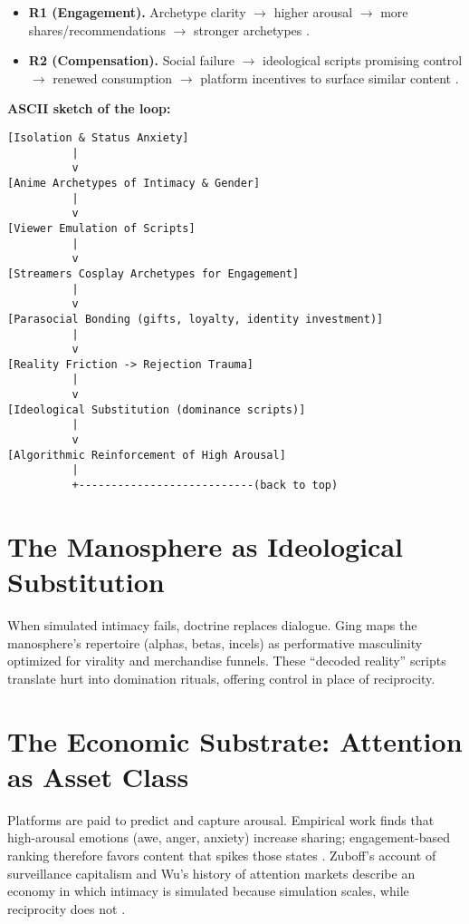 \documentclass[12pt]{article}
\begin{document}
\begin{itemize}
  \item \textbf{R1 (Engagement).} Archetype clarity $\rightarrow$ higher arousal $\rightarrow$ more shares/recommendations $\rightarrow$ stronger archetypes \cite{berger2012}.
  \item \textbf{R2 (Compensation).} Social failure $\rightarrow$ ideological scripts promising control $\rightarrow$ renewed consumption $\rightarrow$ platform incentives to surface similar content \cite{ging2019,zuboff2019,wu2016}.
\end{itemize}

\noindent\textbf{ASCII sketch of the loop:}

\begin{verbatim}
[Isolation & Status Anxiety]
          |
          v
[Anime Archetypes of Intimacy & Gender]
          |
          v
[Viewer Emulation of Scripts]
          |
          v
[Streamers Cosplay Archetypes for Engagement]
          |
          v
[Parasocial Bonding (gifts, loyalty, identity investment)]
          |
          v
[Reality Friction -> Rejection Trauma]
          |
          v
[Ideological Substitution (dominance scripts)]
          |
          v
[Algorithmic Reinforcement of High Arousal]
          |
          +---------------------------(back to top)
\end{verbatim}

\section{The Manosphere as Ideological Substitution}

When simulated intimacy fails, doctrine replaces dialogue. Ging \cite{ging2019} maps the manosphere's repertoire (alphas, betas, incels) as performative masculinity optimized for virality and merchandise funnels. These ``decoded reality'' scripts translate hurt into domination rituals, offering control in place of reciprocity.

\section{The Economic Substrate: Attention as Asset Class}

Platforms are paid to predict and capture arousal. Empirical work finds that high-arousal emotions (awe, anger, anxiety) increase sharing; engagement-based ranking therefore favors content that spikes those states \cite{berger2012}. Zuboff's account of surveillance capitalism and Wu's history of attention markets describe an economy in which intimacy is simulated because simulation scales, while reciprocity does not \cite{zuboff2019,wu2016}.
\end{document}
